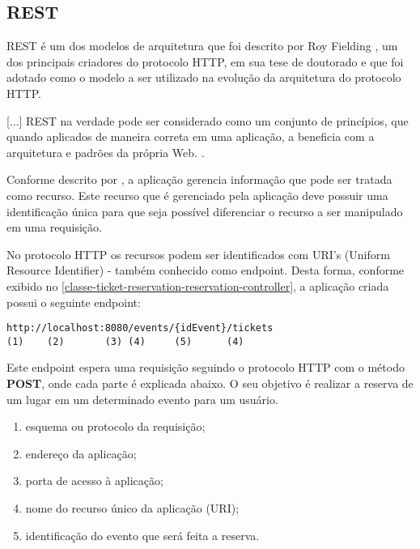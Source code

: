 \subsection{REST}\label{rest}

\begin{citacao}

REST é um dos modelos de arquitetura que foi descrito por
Roy Fielding \cite[5]{rest-roy-thomas-fielding},
um dos principais criadores do protocolo HTTP, em sua tese de doutorado
e que foi adotado como o modelo a ser utilizado na evolução da arquitetura
do protocolo HTTP.

[...] REST na verdade pode ser considerado como um conjunto de princípios,
que quando aplicados de maneira correta em uma aplicação, a beneficia com a
arquitetura e padrões da própria Web. \cite{rest-principios-e-boas-praticas}.

\end{citacao}

Conforme descrito por \cite{rest-principios-e-boas-praticas}, a aplicação
gerencia informação que pode ser tratada como recurso. Este recurso que é
gerenciado pela aplicação deve possuir uma identificação única para que seja
possível diferenciar o recurso a ser manipulado em uma requisição.

No protocolo HTTP os recursos podem ser identificados com
URI's (Uniform Resource Identifier) - também conhecido como endpoint.
Desta forma, conforme exibido no \autoref{classe-ticket-reservation-reservation-controller},
a aplicação criada possui o seguinte endpoint:

\begin{minipage}{\linewidth}
\begin{lstlisting}[basicstyle=\ttfamily]
http://localhost:8080/events/{idEvent}/tickets
(1)    (2)       (3) (4)     (5)      (4)
\end{lstlisting}
\end{minipage}

Este endpoint espera uma requisição seguindo o protocolo HTTP
com o método \textbf{POST}, onde cada parte é explicada abaixo. O seu objetivo é
realizar a reserva de um lugar em um determinado evento para um usuário.

\begin{enumerate}

  \item esquema ou protocolo da requisição;

  \item endereço da aplicação;

  \item porta de acesso à aplicação;

  \item nome do recurso único da aplicação (URI);

  \item identificação do evento que será feita a reserva.

\end{enumerate}

